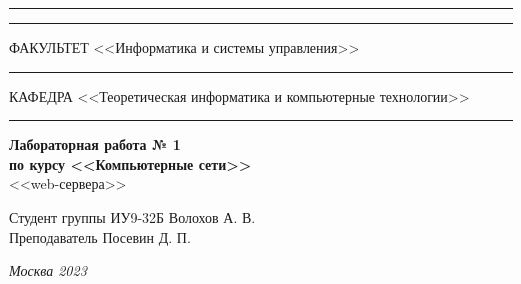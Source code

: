 \documentclass[a4paper, 14pt]{extarticle}
\begin{document}
\begin{titlepage}
\vspace{-25pt}
\hspace{-35pt}\rule{\textwidth}{2.3pt}

\vspace*{-20.3pt}
\hspace{-35pt}\rule{\textwidth}{0.4pt}

\vspace{1.5ex}
\hspace{-35pt} \noindent \small ФАКУЛЬТЕТ\hspace{80pt} <<Информатика и системы управления>>

\vspace*{-16pt}
\hspace{47pt}\rule{0.83\textwidth}{0.4pt}

\vspace{0.5ex}
\hspace{-35pt} \noindent \small КАФЕДРА\hspace{50pt} <<Теоретическая информатика и компьютерные технологии>>

\vspace*{-16pt}
\hspace{30pt}\rule{0.866\textwidth}{0.4pt}
  
\vspace{11em}

\begin{center}
\Large {\bf Лабораторная работа № 1} \\ 
\large {\bf по курсу <<Компьютерные сети>>} \\
\large <<web-сервера>> 
\end{center}\normalsize

\vspace{8em}


\begin{flushright}
  {Студент группы ИУ9-32Б Волохов А. В. \hspace*{15pt}\\ 
  \vspace{2ex}
  Преподаватель Посевин Д. П.\hspace*{15pt}}
\end{flushright}

\bigskip

\vfill
 

\begin{center}
\textsl{Москва 2023}
\end{center}
\end{titlepage}
\end{document}
